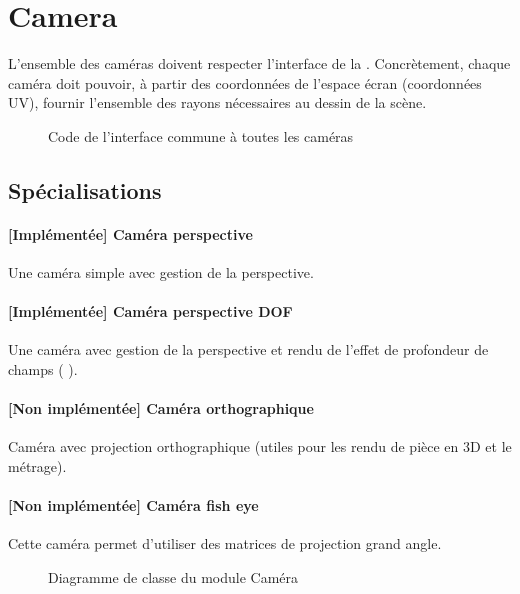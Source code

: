 \section{Camera}
L'ensemble des caméras doivent respecter l'interface de la . Concrètement, chaque caméra doit pouvoir, à partir des
coordonnées de l'espace écran (coordonnées UV), fournir l'ensemble des rayons
nécessaires au dessin de la scène.

\begin{figure}[h]
  \caption{Code de l'interface commune à toutes les
  caméras\label{fig:ICamera}}
\end{figure}

\subsection{Spécialisations}
\paragraph{[Implémentée] Caméra perspective} Une caméra simple avec gestion de
la perspective.

\paragraph{[Implémentée] Caméra perspective DOF} Une caméra avec
gestion de la perspective et rendu de l'effet de profondeur de champs (\cf
{}).

\paragraph{[Non implémentée] Caméra orthographique} Caméra avec projection
orthographique (utiles pour les rendu de pièce en 3D et le métrage).

\paragraph{[Non implémentée] Caméra fish eye} Cette caméra permet d'utiliser
des matrices de projection grand angle.

\begin{figure}[h]
\begin{center}
  \noindent{}
  \caption{Diagramme de classe du module Caméra\label{fig:CDCamera}}
\end{center}
\end{figure}
